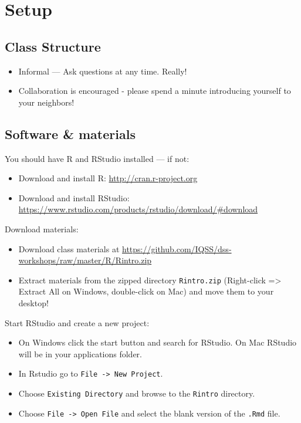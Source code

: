 \documentclass[]{book}
\providecommand{\tightlist}{%
  \setlength{\itemsep}{0pt}\setlength{\parskip}{0pt}}
\begin{document}
\hypertarget{setup}{%
\section{Setup}\label{setup}}

\hypertarget{class-structure}{%
\subsection{Class Structure}\label{class-structure}}

\begin{itemize}
\tightlist
\item
  Informal --- Ask questions at any time. Really!
\item
  Collaboration is encouraged - please spend a minute introducing yourself to your neighbors!
\end{itemize}

\hypertarget{software-materials}{%
\subsection{Software \& materials}\label{software-materials}}

You should have R and RStudio installed --- if not:

\begin{itemize}
\tightlist
\item
  Download and install R: \url{http://cran.r-project.org}
\item
  Download and install RStudio: \url{https://www.rstudio.com/products/rstudio/download/\#download}
\end{itemize}

Download materials:

\begin{itemize}
\tightlist
\item
  Download class materials at \url{https://github.com/IQSS/dss-workshops/raw/master/R/Rintro.zip}
\item
  Extract materials from the zipped directory \texttt{Rintro.zip} (Right-click =\textgreater{} Extract All on Windows, double-click on Mac) and move them to your desktop!
\end{itemize}

Start RStudio and create a new project:

\begin{itemize}
\tightlist
\item
  On Windows click the start button and search for RStudio. On Mac
  RStudio will be in your applications folder.
\item
  In Rstudio go to \texttt{File\ -\textgreater{}\ New\ Project}.
\item
  Choose \texttt{Existing\ Directory} and browse to the \texttt{Rintro} directory.
\item
  Choose \texttt{File\ -\textgreater{}\ Open\ File} and select the blank version of the \texttt{.Rmd} file.
\end{itemize}
\end{document}
